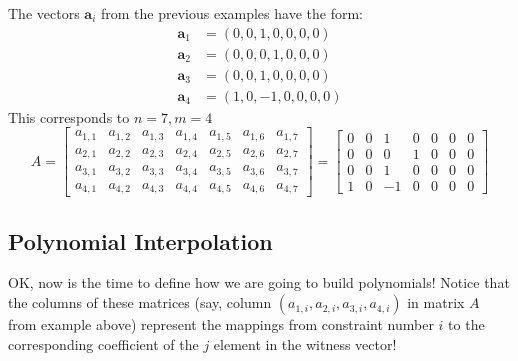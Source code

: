 \documentclass[../lecture-notes.tex]{subfiles}
\begin{document}
\begin{example}
    The vectors $\mathbf{a}_i$ from the previous examples have the form:
    \begin{align*}
        \mathbf{a}_1 &= (0, 0, 1, 0, 0, 0, 0) \\
        \mathbf{a}_2 &= (0, 0, 0, 1, 0, 0, 0) \\
        \mathbf{a}_3 &= (0, 0, 1, 0, 0, 0, 0) \\
        \mathbf{a}_4 &= (1, 0, -1, 0, 0, 0, 0)
    \end{align*}
    This corresponds to $n = 7, m = 4$
    \begin{equation*}
        A = \begin{bmatrix}
            a_{1,1} & a_{1,2} & a_{1,3} & a_{1,4} & a_{1,5} & a_{1,6} & a_{1,7} \\
            a_{2,1} & a_{2,2} & a_{2,3} & a_{2,4} & a_{2,5} & a_{2,6} & a_{2,7} \\
            a_{3,1} & a_{3,2} & a_{3,3} & a_{3,4} & a_{3,5} & a_{3,6} & a_{3,7} \\
            a_{4,1} & a_{4,2} & a_{4,3} & a_{4,4} & a_{4,5} & a_{4,6} & a_{4,7}
        \end{bmatrix} = \begin{bmatrix}
            0 & 0 & 1 & 0 & 0 & 0 & 0 \\
            0 & 0 & 0 & 1 & 0 & 0 & 0 \\
            0 & 0 & 1 & 0 & 0 & 0 & 0 \\
            1 & 0 & -1 & 0 & 0 & 0 & 0 
        \end{bmatrix}
    \end{equation*}
\end{example}

\subsection{Polynomial Interpolation}

OK, now is the time to define how we are going to build polynomials! Notice that the columns of these matrices (say, column $(a_{1,i},a_{2,i},a_{3,i},a_{4,i})$ in matrix $A$ from example above) represent the mappings from constraint number $i$ to the corresponding
coefficient of the $j$ element in the witness vector!
\end{document}
